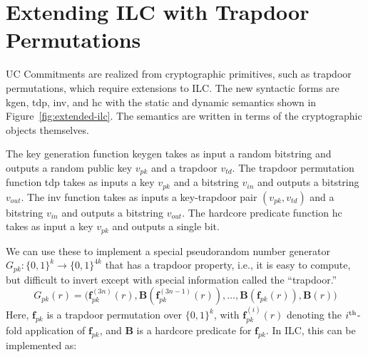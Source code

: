 \section{Extending ILC with Trapdoor Permutations}

UC Commitments are realized from cryptographic primitives, such as trapdoor
permutations, which require extensions to ILC. The new syntactic forms are
\textsf{kgen}, \textsf{tdp}, \textsf{inv}, and \textsf{hc} with the static and
dynamic semantics shown in Figure~\ref{fig:extended-ilc}. The semantics are
written in terms of the cryptographic objects themselves.

The key generation function \textsf{keygen} takes as input a random bitstring
and outputs a random public key $v_{pk}$ and a trapdoor $v_{td}$. The trapdoor
permutation function
\textsf{tdp} takes as inputs a key $v_{pk}$ and a bitstring $v_{in}$ and outputs
a bitstring $v_{out}$. The \textsf{inv} function takes as inputs a key-trapdoor
pair $(v_{pk}, v_{td})$ and a bitstring $v_{in}$ and outputs a bitstring
$v_{out}$. The hardcore predicate function
\textsf{hc} takes as input a key $v_{pk}$ and outputs a single bit.



We can use these to implement a special pseudorandom number generator $G_{pk}
\colon \{0,1\}^k \to \{0,1\}^{4k}$ that has a trapdoor property, i.e., it is easy
to compute, but difficult to invert except with special information called the
``trapdoor.''
\[ G_{pk}(r) = \big(\mathbf{f}_{pk}^{(3n)}(r),
\mathbf{B}(\mathbf{f}_{pk}^{(3n-1)}(r)), \ldots, \mathbf{B}(\mathbf{f}_{pk}(r)),
\mathbf{B}(r)\big)\]
\noindent Here, $\mathbf{f}_{pk}$ is a trapdoor permutation over $\{0,1\}^{k}$,
with $\mathbf{f}_{pk}^{(i)}(r)$ denoting the $i^{\textnormal{th}}$-fold
application of $\mathbf{f}_{pk}$, and $\mathbf{B}$ is a hardcore predicate for
$\mathbf{f}_{pk}$. In ILC, this can be implemented as:


